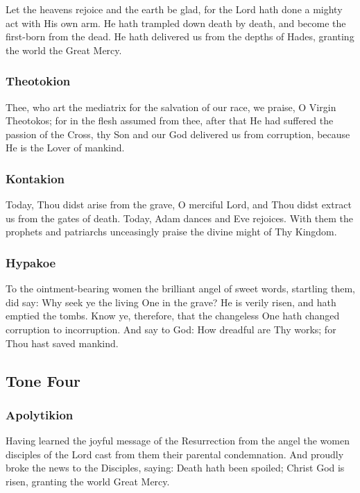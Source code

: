 Let the heavens rejoice and the earth be glad, for the Lord hath done a mighty act with His own arm. He hath trampled down death by death, and become the first-born from the dead. He hath delivered us from the depths of Hades, granting the world the Great Mercy.

\subsubsection{Theotokion}

Thee, who art the mediatrix for the salvation of our race, we praise, O Virgin Theotokos; for in the flesh assumed from thee, after that He had suffered the passion of the Cross, thy Son and our God delivered us from corruption, because He is the Lover of mankind.

\subsubsection{Kontakion}

Today, Thou didst arise from the grave, O merciful Lord, and Thou didst extract us from the gates of death. Today, Adam dances and Eve rejoices. With them the prophets and patriarchs unceasingly praise the divine might of Thy Kingdom.

\subsubsection{Hypakoe}

To the ointment-bearing women the brilliant angel of sweet words, startling them, did say: Why seek ye the living One in the grave? He is verily risen, and hath emptied the tombs. Know ye, therefore, that the changeless One hath changed corruption to incorruption. And say to God: How dreadful are Thy works; for Thou hast saved mankind.

\subsection{Tone Four}

\subsubsection{Apolytikion}

Having learned the joyful message of the Resurrection from the angel the women disciples of the Lord cast from them their parental condemnation. And proudly broke the news to the Disciples, saying: Death hath been spoiled; Christ God is risen, granting the world Great Mercy.

